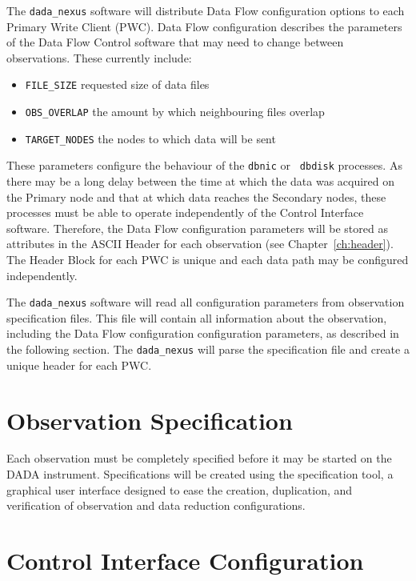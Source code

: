 The {\tt dada\_nexus} software will distribute Data Flow configuration
options to each Primary Write Client (PWC).  Data Flow configuration
describes the parameters of the Data Flow Control software that may
need to change between observations.  These currently
include:
\begin{itemize}
\item{\tt FILE\_SIZE} requested size of data files
\item{\tt OBS\_OVERLAP} the amount by which neighbouring files overlap
\item{\tt TARGET\_NODES} the nodes to which data will be sent
\end{itemize}
These parameters configure the behaviour of the {\tt dbnic} or {\tt
dbdisk} processes.  As there may be a long delay between the time at
which the data was acquired on the Primary node and that at which data
reaches the Secondary nodes, these processes must be able to operate
independently of the Control Interface software.  Therefore, the
Data Flow configuration parameters will be stored as attributes in the
ASCII Header for each observation (see Chapter~\ref{ch:header}).  The
Header Block for each PWC is unique and each data
path may be configured independently.

The {\tt dada\_nexus} software will read all configuration parameters
from observation specification files.  This file will contain all
information about the observation, including the Data Flow
configuration configuration parameters, as described in the following
section.  The {\tt dada\_nexus} will parse the specification file and
create a unique header for each PWC.

\section{Observation Specification}

Each observation must be completely specified before it may be started
on the DADA instrument.  Specifications will be created using the
specification tool, a graphical user interface designed to ease the
creation, duplication, and verification of observation and data
reduction configurations.

\section{Control Interface Configuration}


